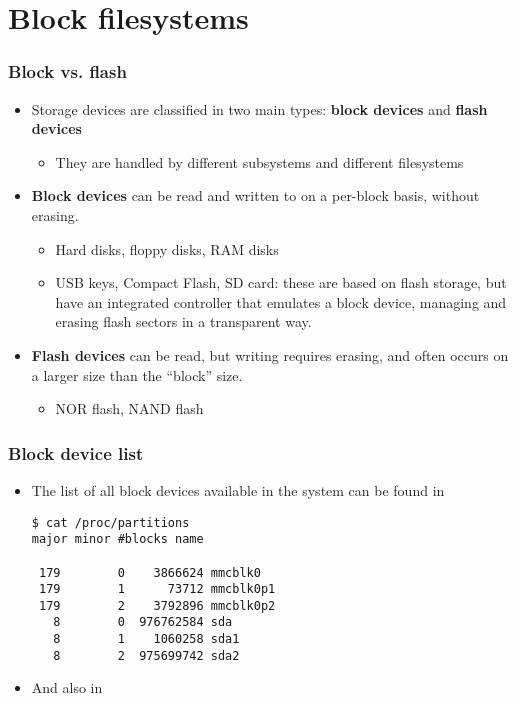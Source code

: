 \section{Block filesystems}

\begin{frame}
  \frametitle{Block vs. flash}
  \begin{itemize}
  \item Storage devices are classified in two main types: {\bf block
      devices} and {\bf flash devices}
    \begin{itemize}
    \item They are handled by different subsystems and different
      filesystems
    \end{itemize}
  \item {\bf Block devices} can be read and written to on a per-block
    basis, without erasing.
    \begin{itemize}
    \item Hard disks, floppy disks, RAM disks
    \item USB keys, Compact Flash, SD card: these are based on
      flash storage, but have an integrated controller that emulates a block
      device, managing and erasing flash sectors in a transparent way. 
    \end{itemize}
  \item {\bf Flash devices} can be read, but writing requires erasing,
    and often occurs on a larger size than the “block” size.
    \begin{itemize}
    \item NOR flash, NAND flash
    \end{itemize}
  \end{itemize}
\end{frame}

\begin{frame}[fragile]
  \frametitle{Block device list}
  \begin{itemize}
  \item The list of all block devices available in the system can be
    found in \\
\begin{verbatim}
$ cat /proc/partitions
major minor #blocks name

 179        0    3866624 mmcblk0
 179        1      73712 mmcblk0p1
 179        2    3792896 mmcblk0p2
   8        0  976762584 sda
   8        1    1060258 sda1
   8        2  975699742 sda2
\end{verbatim}
  \item And also in 
  \end{itemize}
\end{frame}

